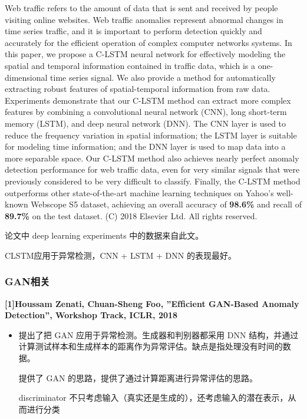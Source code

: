 \documentclass[12pt]{article}
\begin{document}
Web traffic refers to the amount of data that is sent and received by
people visiting online websites. Web traffic anomalies represent
abnormal changes in time series traffic, and it is important to perform
detection quickly and accurately for the efficient operation of complex
computer networks systems. In this paper, we propose a C-LSTM neural
network for effectively modeling the spatial and temporal information
contained in traffic data, which is a one-dimensional time series
signal. We also provide a method for automatically extracting robust
features of spatial-temporal information from raw data. Experiments
demonstrate that our C-LSTM method can extract more complex features by
combining a convolutional neural network (CNN), long short-term memory
(LSTM), and deep neural network (DNN). The CNN layer is used to reduce
the frequency variation in spatial information; the LSTM layer is
suitable for modeling time information; and the DNN layer is used to map
data into a more separable space. Our C-LSTM method also achieves nearly
perfect anomaly detection performance for web traffic data, even for
very similar signals that were previously considered to be very
difficult to classify. Finally, the C-LSTM method outperforms other
state-of-the-art machine learning techniques on Yahoo's well-known
Webscope S5 dataset, achieving an overall accuracy of \textbf{98.6\%}
and recall of \textbf{89.7\%} on the test dataset. (C) 2018 Elsevier
Ltd. All rights reserved.

论文中 deep learning experiments 中的数据来自此文。

CLSTM应用于异常检测，CNN + LSTM + DNN 的表现最好。

\subsubsection{GAN相关}\label{header-n520}

\textbf{{[}1{]}Houssam Zenati, Chuan-Sheng Foo, ''Efﬁcient GAN-Based
Anomaly Detection'', Workshop Track, ICLR, 2018}

\begin{itemize}
\item
  提出了把 GAN 应用于异常检测。生成器和判别器都采用 DNN
  结构，并通过计算测试样本和生成样本的距离作为异常评估。缺点是指处理没有时间的数据。

  提供了 GAN 的思路，提供了通过计算距离进行异常评估的思路。

  discriminator
  不只考虑输入（真实还是生成的），还考虑输入的潜在表示，从而进行分类
\end{itemize}
\end{document}
